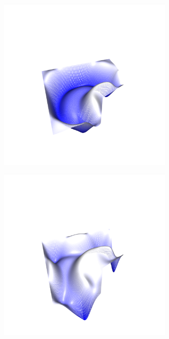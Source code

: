 \documentclass[crop=false,10pt,ngerman]{standalone}
\begin{document}
\begin{figure}[h]
        \begin{subfigure}[b]{0.24\textwidth}
          \center
          \includegraphics[trim={4cm 1.2cm 4.5cm 1.5cm},clip,width=0.95\textwidth]{images/test_wave_4.png}
          \caption{}
        \end{subfigure}
        \begin{subfigure}[b]{0.24\textwidth}
          \center
          \includegraphics[trim={4cm 1.2cm 4.5cm 1.5cm},clip,width=0.95\textwidth]{images/test_wave_5.png}

\end{subfigure}
\end{figure}
\end{document}
